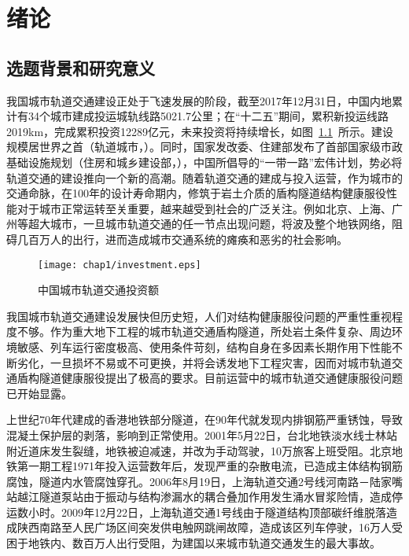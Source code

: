 \chapter{绪论}

\section{选题背景和研究意义}

我国城市轨道交通建设正处于飞速发展的阶段，截至2017年12月31日，中国内地累计有34个城市建成投运城轨线路5021.7公里；在“十二五”期间，累积新投运线路2019km，完成累积投资12289亿元，未来投资将持续增长，如图~\ref{fig:城市轨道交通投资额}~所示。建设规模居世界之首（轨道城市，\citeyear{轨道2017}）。同时，国家发改委、住建部发布了首部国家级市政基础设施规划（住房和城乡建设部，\citeyear{住房和城乡建设部}），中国所倡导的“一带一路”宏伟计划，势必将轨道交通的建设推向一个新的高潮。随着轨道交通的建成与投入运营，作为城市的交通命脉，在100年的设计寿命期内，修筑于岩土介质的盾构隧道结构健康服役性能对于城市正常运转至关重要，越来越受到社会的广泛关注。例如北京、上海、广州等超大城市，一旦城市轨道交通的任一节点出现问题，将波及整个地铁网络，阻碍几百万人的出行，进而造成城市交通系统的瘫痪和恶劣的社会影响。

\begin{figure}[!h]
	\centering
	\texttt{[image: chap1/investment.eps]}
	\caption{中国城市轨道交通投资额}
	\label{fig:城市轨道交通投资额}
\end{figure}

我国城市轨道交通建设发展快但历史短，人们对结构健康服役问题的严重性重视程度不够。作为重大地下工程的城市轨道交通盾构隧道，所处岩土条件复杂、周边环境敏感、列车运行密度极高、使用条件苛刻，结构自身在多因素长期作用下性能不断劣化，一旦损坏不易或不可更换，并将会诱发地下工程灾害，因而对城市轨道交通盾构隧道健康服役提出了极高的要求。目前运营中的城市轨道交通健康服役问题已开始显露。

上世纪70年代建成的香港地铁部分隧道，在90年代就发现内排钢筋严重锈蚀，导致混凝土保护层的剥落，影响到正常使用。2001年5月22日，台北地铁淡水线士林站附近道床发生裂缝，地铁被迫减速，并改为手动驾驶，10万旅客上班受阻。北京地铁第一期工程1971年投入运营数年后，发现严重的杂散电流，已造成主体结构钢筋腐蚀，隧道内水管腐蚀穿孔。2006年8月19日，上海轨道交通2号线河南路－陆家嘴站越江隧道泵站由于振动与结构渗漏水的耦合叠加作用发生涌水冒浆险情，造成停运数小时。2009年12月22日，上海轨道交通1号线由于隧道结构顶部碳纤维脱落造成陕西南路至人民广场区间突发供电触网跳闸故障，造成该区列车停驶，16万人受困于地铁内、数百万人出行受阻，为建国以来城市轨道交通发生的最大事故。 

